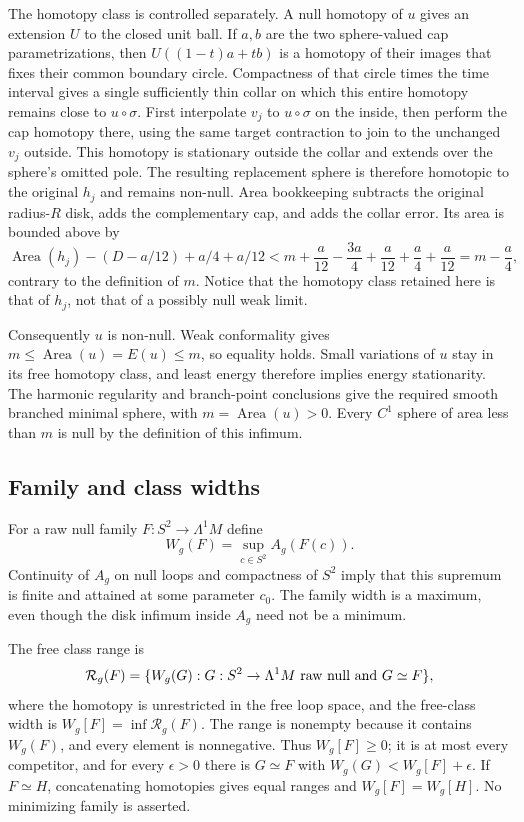 The homotopy class is controlled separately. A null homotopy of
$u$ gives an extension $U$ to the closed unit ball. If $a,b$ are
the two sphere-valued cap parametrizations, then
$U((1-t)a+tb)$ is a homotopy of their images that fixes their
common boundary circle. Compactness of that circle times the
time interval gives a single sufficiently thin collar on which
this entire homotopy remains close to $u\circ\sigma$. First
interpolate $v_j$ to $u\circ\sigma$ on the inside, then perform
the cap homotopy there, using the same target contraction to join
to the unchanged $v_j$ outside. This homotopy is stationary
outside the collar and extends over the sphere's omitted pole.
The resulting replacement sphere is therefore homotopic to the
original $h_j$ and remains non-null. Area bookkeeping subtracts
the original radius-$R$ disk, adds the complementary cap, and
adds the collar error. Its area is bounded above by
\[
 \operatorname{Area}(h_j)-(D-a/12)+a/4+a/12
 <m+\frac a{12}-\frac{3a}{4}+\frac a{12}+\frac a4+\frac a{12}
 =m-\frac a4,
\]
contrary to the definition of $m$. Notice that the homotopy class retained
here is that of $h_j$, not that of a possibly null weak limit.

Consequently $u$ is non-null. Weak conformality gives
$m\leq\operatorname{Area}(u)=E(u)\leq m$, so equality holds.
Small variations of $u$ stay in its free homotopy class, and least energy
therefore implies energy stationarity. The harmonic regularity and
branch-point conclusions give the required smooth branched minimal
sphere, with $m=\operatorname{Area}(u)>0$. Every $C^1$ sphere of area
less than $m$ is null by the definition of this infimum.

\subsection{Family and class widths}

For a raw null family $F:S^2\to\Lambda^1M$ define
\[
 W_g(F)=\sup_{c\in S^2}A_g(F(c)).
\]
Continuity of $A_g$ on null loops and compactness of $S^2$ imply that this
supremum is finite and attained at some parameter $c_0$. The family width is a
maximum, even though the disk infimum inside $A_g$ need not be a minimum.

The free class range is
\[
 {\cal R}_g(F)=\{W_g(G):G:S^2\to\Lambda^1M\text{ raw null and }G\simeq F\},
\]
where the homotopy is unrestricted in the free loop space, and the free-class
width is $W_g[F]=\inf\mathcal R_g(F)$. The range is nonempty because it
contains $W_g(F)$, and every element is nonnegative. Thus $W_g[F]\geq0$;
it is at most every competitor, and for every $\epsilon>0$ there is
$G\simeq F$ with $W_g(G)<W_g[F]+\epsilon$. If $F\simeq H$,
concatenating homotopies gives equal ranges and $W_g[F]=W_g[H]$.
No minimizing family is asserted.

